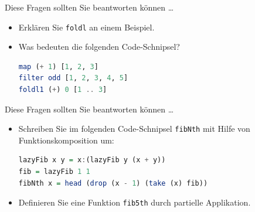 \documentclass[svgnames,smaller,ngerman]{beamer}
\begin{document}
\begin{frame}[fragile]{Diese Fragen sollten Sie beantworten können \ldots}
    \begin{itemize}
        \item Erklären Sie \verb/foldl/ an einem Beispiel.
        \item Was bedeuten die folgenden Code-Schnipsel?
            \begin{small}
            \begin{lstlisting}[language=Haskell]
map (+ 1) [1, 2, 3]
filter odd [1, 2, 3, 4, 5]
foldl1 (+) 0 [1 .. 3]
            \end{lstlisting}
            \end{small}
    \end{itemize}
\end{frame}


\begin{frame}[fragile]{Diese Fragen sollten Sie beantworten können \ldots}
    \begin{itemize}
        \item Schreiben Sie im folgenden Code-Schnipsel \verb/fibNth/ mit Hilfe
              von Funktionskomposition um:
            \begin{small}
            \begin{lstlisting}[language=Haskell]
lazyFib x y = x:(lazyFib y (x + y))
fib = lazyFib 1 1
fibNth x = head (drop (x - 1) (take (x) fib))
            \end{lstlisting}
            \end{small}
        \item Definieren Sie eine Funktion \verb/fib5th/ durch partielle
              Applikation.
    \end{itemize}
\end{frame}
\end{document}
